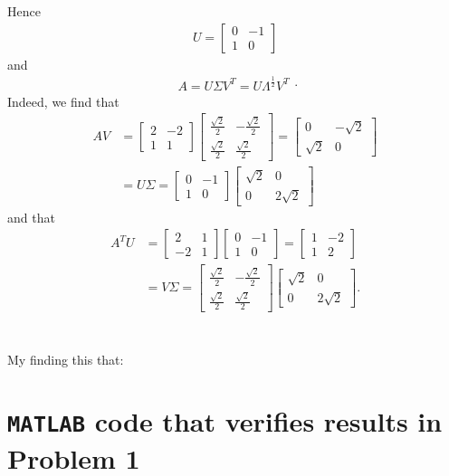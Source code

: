 \documentclass[11pt]{article}
\begin{document}
Hence 
\begin{equation}\begin{split} U = \begin{bmatrix} 0 & -1 \\ 1 & 0\end{bmatrix} \end{split}\nonumber\end{equation} and
\begin{equation}\begin{split} A = U\Sigma V^T = U\Lambda^{\frac12}V^T\end{split}.\nonumber\end{equation}
Indeed, we find that 
\begin{equation}\begin{split} 
AV &= \begin{bmatrix} 2 & -2\\1 & 1\end{bmatrix}\begin{bmatrix} \frac{\sqrt{2}}2 & -\frac{\sqrt{2}}2 \\ \frac{\sqrt{2}}2 & \frac{\sqrt{2}}2 \end{bmatrix} = 
\begin{bmatrix} 0 & -\sqrt{2} \\ \sqrt{2} & 0\end{bmatrix}\\
&= U\Sigma = \begin{bmatrix} 0 & -1\\1 & 0\end{bmatrix}\begin{bmatrix} \sqrt{2} & 0\\0 & 2 \sqrt{2} \end{bmatrix}   
\end{split}\nonumber\end{equation} 
and that
\begin{equation}\begin{split} 
A^TU &= \begin{bmatrix} 2 &1 \\ -2 & 1\end{bmatrix} \begin{bmatrix} 0 & -1\\1 & 0\end{bmatrix} = \begin{bmatrix} 1 & -2\\ 1 & 2\end{bmatrix} \\
&=V\Sigma = \begin{bmatrix} \frac{\sqrt{2}}2 & -\frac{\sqrt{2}}2 \\ \frac{\sqrt{2}}2 & \frac{\sqrt{2}}2 \end{bmatrix} \begin{bmatrix}\sqrt{2} & 0\\0 & 2\sqrt{2}\end{bmatrix}.
\end{split}\nonumber\end{equation} 

\section{}
My finding this that:


\newpage
\appendix{}
\section{\texttt{MATLAB} code that verifies results in Problem 1}
\end{document}
